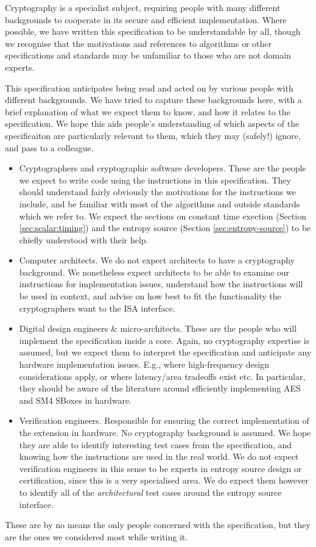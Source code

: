 
Cryptography is a specialist subject, requiring people with many different
backgrounds to cooperate in its secure and efficient implementation.
Where possible, we have written this specification to be understandable by
all, though we recognise that the motivations and references to
algorithms or other specifications and standards may be unfamiliar to those
who are not domain experts.

This specification anticipates being read and acted on by various people
with different backgrounds.
We have tried to capture these backgrounds
here, with a brief explanation of what we expect them to know, and how
it relates to the specification.
We hope this aids people's understanding of which aspects of the specificaiton
are particularly relevant to them, which they may (safely!) ignore, and
pass to a colleague.

\begin{itemize}
\item Cryptographers and cryptographic software developers.
  These are the people we expect to write code using the instructions
  in this specification.
  They should understand fairly obviously the motivations for the
  instructions we include, and be familiar with most of the algorithms
  and outside standards which we refer to.
  We expect the sections on constant time exection
  (Section \ref{sec:scalar:timing})
  and the entropy source (Section \ref{sec:entropy-source})
  to be chiefly understood with their help.
\item Computer architects.
  We do not expect architects to have a cryptography background.
  We nonetheless expect architects to be able to examine our instructions
  for implementation issues, understand how the instructions will be used
  in context, and advise on how best to fit the functionality the
  cryptographers want to the ISA interface.
\item Digital design engineers \& micro-architects.
  These are the people who will implement the specification inside a
  core. Again, no cryptography expertise is assumed, but we expect them to
  interpret the specification and anticipate any hardware implementation
  issues. E.g., where high-frequency design considerations apply, or where
  latency/area tradeoffs exist etc.
  In particular, they should be aware of the literature around efficiently
  implementing AES and SM4 SBoxes in hardware.
\item Verification engineers.
  Responsible for ensuring the correct implementation of the extension
  in hardware.
  No cryptography background is assumed.
  We hope they are able to identify interesting test cases from the
  specification, and knowing how the instructions are used in the real world.
  We do not expect verification engineers in this sense to be experts
  in entropy source design or certification, since this is a very
  specialised area.
  We do expect them however to identify all of the {\em architectural}
  test cases around the entropy source interface.
\end{itemize}

These are by no means the only people concerned with the specification,
but they are the ones we considered most while writing it.

